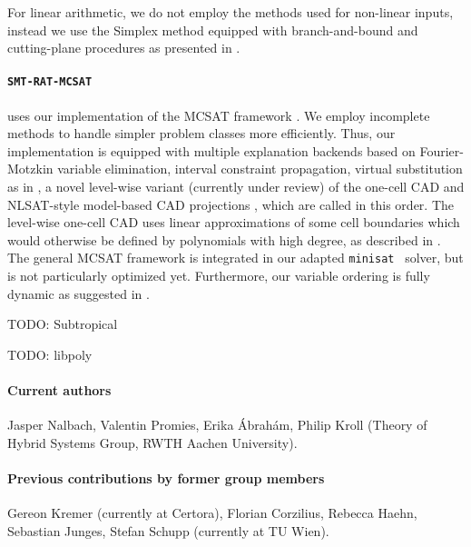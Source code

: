 \documentclass{article}
\begin{document}
For linear arithmetic, we do not employ the methods used for non-linear inputs, instead we use the Simplex method equipped with branch-and-bound and cutting-plane procedures as presented in \cite{DM06}.
\fi

\paragraph{\texttt{SMT-RAT-MCSAT}} uses our implementation of the MCSAT framework \cite{Moura2013}.
We employ incomplete methods to handle simpler problem classes more efficiently.
Thus, our implementation is equipped with multiple explanation backends based on Fourier-Motzkin variable elimination, interval constraint propagation, virtual substitution as in \cite{Abraham2017}, a novel level-wise variant (currently under review) of the one-cell CAD \cite{brown2015constructing} and NLSAT-style model-based CAD projections \cite{jovanovic2012solving}, which are called in this order.
The level-wise one-cell CAD uses linear approximations of some cell boundaries which would otherwise be defined by polynomials with high degree, as described in \cite{promies_msc}.
The general MCSAT framework is integrated in our adapted \texttt{minisat}~\cite{Een2003} solver, but is not particularly optimized yet.
Furthermore, our variable ordering is fully dynamic as suggested in \cite{Jovanovic2013}.

TODO: Subtropical

TODO: libpoly


\paragraph{Current authors}
Jasper Nalbach, Valentin Promies, Erika \'Abrah\'am, Philip Kroll
(Theory of Hybrid Systems Group, RWTH Aachen University).

\paragraph{Previous contributions by former group members}
Gereon Kremer (currently at Certora),
Florian Corzilius,
Rebecca Haehn,
Sebastian Junges,
Stefan Schupp (currently at TU Wien).




\end{document}

